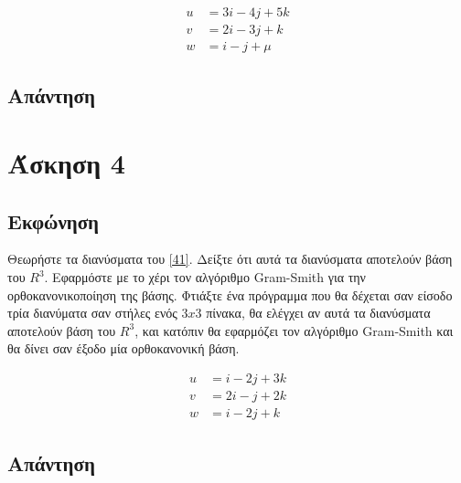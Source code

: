\documentclass[14pt]{extreport}
\begin{document}
\begin{equation}
    \begin{aligned}
        u & = 3i - 4j + 5k \\
        v & = 2i - 3j + k  \\
        w & = i - j + \mu
    \end{aligned}\label{31}
\end{equation}

\newpage
\section{Απάντηση}

\chapter{Άσκηση 4}
\section{Εκφώνηση}

Θεωρήστε τα διανύσματα του \eqref{41}. Δείξτε ότι αυτά τα διανύσματα αποτελούν βάση του $R^{3}$. Εφαρμόστε με το χέρι τον αλγόριθμο Gram-Smith για την ορθοκανονικοποίηση της βάσης. Φτιάξτε ένα πρόγραμμα που θα δέχεται σαν είσοδο τρία διανύματα σαν στήλες ενός $3x3$ πίνακα, θα ελέγχει αν αυτά τα διανύσματα αποτελούν βάση του $R^{3}$, και κατόπιν θα εφαρμόζει τον αλγόριθμο Gram-Smith και θα δίνει σαν έξοδο μία ορθοκανονική βάση.

\begin{equation}
    \begin{aligned}
        u & = i - 2j + 3k \\
        v & = 2i - j + 2k \\
        w & = i - 2j + k
    \end{aligned}\label{41}
\end{equation}

\newpage
\section{Απάντηση}
\end{document}
